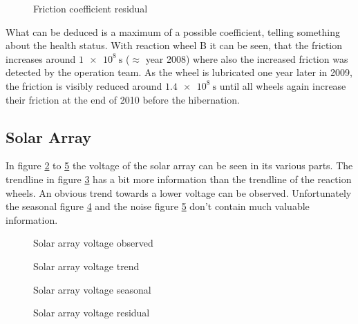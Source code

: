 \begin{figure}[H]
\centering

\caption{Friction coefficient residual}
\label{f:rwl_x_residual}
\end{figure}

What can be deduced is a maximum of a possible coefficient, telling something about the health status. With reaction wheel B it can be seen, that the friction increases around $\SI{1e8}{\second}$ ($\approx$ year 2008) where also the increased friction was detected by the operation team. As the wheel is lubricated one year later in 2009, the friction is visibly reduced around $\SI{1.4e8}{\second}$ until all wheels again increase their friction at the end of 2010 before the hibernation.

\subsection{Solar Array}
In figure \ref{f:sag_x_observed} to \ref{f:sag_x_residual} the voltage of the solar array can be seen in its various parts. The trendline in figure \ref{f:sag_x_trend} has a bit more information than the trendline of the reaction wheels. An obvious trend towards a lower voltage can be observed. Unfortunately the seasonal figure \ref{f:sag_x_seasonal} and the noise figure \ref{f:sag_x_residual} don't contain much valuable information.

\begin{figure}[H]
\centering

\caption{Solar array voltage observed}
\label{f:sag_x_observed}
\end{figure}

\begin{figure}[H]
\centering

\caption{Solar array voltage trend}
\label{f:sag_x_trend}
\end{figure}

\begin{figure}[H]
\centering

\caption{Solar array voltage seasonal}
\label{f:sag_x_seasonal}
\end{figure}

\begin{figure}[H]
\centering

\caption{Solar array voltage residual}
\label{f:sag_x_residual}
\end{figure}

